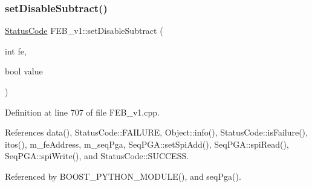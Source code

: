 \mbox{\label{classFEB__v1_a067a0aeae34dbd782547afbcd82fc77f}} 
\subsubsection{\texorpdfstring{set\+Disable\+Subtract()}{setDisableSubtract()}}
{\footnotesize\ttfamily \hyperlink{classStatusCode}{Status\+Code} F\+E\+B\+\_\+v1\+::set\+Disable\+Subtract (\begin{DoxyParamCaption}\item[{int}]{fe,  }\item[{bool}]{value }\end{DoxyParamCaption})}



Definition at line 707 of file F\+E\+B\+\_\+v1.\+cpp.



References data(), Status\+Code\+::\+F\+A\+I\+L\+U\+RE, Object\+::info(), Status\+Code\+::is\+Failure(), itos(), m\+\_\+fe\+Address, m\+\_\+seq\+Pga, Seq\+P\+G\+A\+::set\+Spi\+Add(), Seq\+P\+G\+A\+::spi\+Read(), Seq\+P\+G\+A\+::spi\+Write(), and Status\+Code\+::\+S\+U\+C\+C\+E\+SS.



Referenced by B\+O\+O\+S\+T\+\_\+\+P\+Y\+T\+H\+O\+N\+\_\+\+M\+O\+D\+U\+L\+E(), and seq\+Pga().


